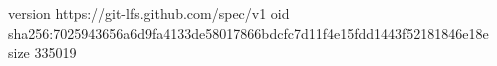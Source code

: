 version https://git-lfs.github.com/spec/v1
oid sha256:7025943656a6d9fa4133de58017866bdcfc7d11f4e15fdd1443f52181846e18e
size 335019
